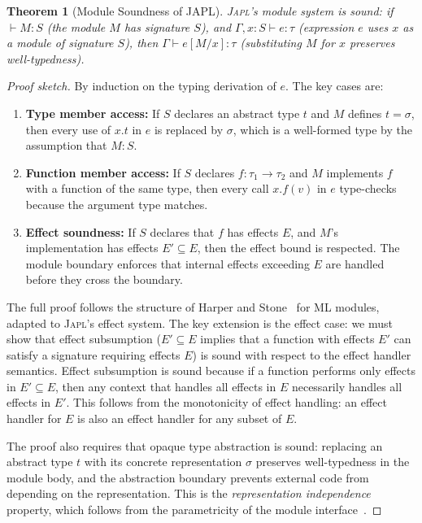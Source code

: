 \documentclass[11pt,a4paper]{article}
\newtheorem{theorem}{Theorem}[section]
\newcommand{\japl}{\textsc{Japl}}
\begin{document}
\begin{theorem}[Module Soundness of JAPL]
\label{thm:module-soundness}
\japl{}'s module system is sound: if $\vdash M : S$ (the module $M$ has signature $S$), and $\Gamma, x : S \vdash e : \tau$ (expression $e$ uses $x$ as a module of signature $S$), then $\Gamma \vdash e[M/x] : \tau$ (substituting $M$ for $x$ preserves well-typedness).
\end{theorem}

\begin{proof}[Proof sketch]
By induction on the typing derivation of $e$. The key cases are:
\begin{enumerate}
  \item \textbf{Type member access:} If $S$ declares an abstract type $t$ and $M$ defines $t = \sigma$, then every use of $x.t$ in $e$ is replaced by $\sigma$, which is a well-formed type by the assumption that $M : S$.
  \item \textbf{Function member access:} If $S$ declares $f : \tau_1 \to \tau_2$ and $M$ implements $f$ with a function of the same type, then every call $x.f(v)$ in $e$ type-checks because the argument type matches.
  \item \textbf{Effect soundness:} If $S$ declares that $f$ has effects $E$, and $M$'s implementation has effects $E' \subseteq E$, then the effect bound is respected. The module boundary enforces that internal effects exceeding $E$ are handled before they cross the boundary.
\end{enumerate}
The full proof follows the structure of Harper and Stone~\citep{harper2000interpretation} for ML modules, adapted to \japl{}'s effect system. The key extension is the effect case: we must show that effect subsumption ($E' \subseteq E$ implies that a function with effects $E'$ can satisfy a signature requiring effects $E$) is sound with respect to the effect handler semantics. Effect subsumption is sound because if a function performs only effects in $E' \subseteq E$, then any context that handles all effects in $E$ necessarily handles all effects in $E'$. This follows from the monotonicity of effect handling: an effect handler for $E$ is also an effect handler for any subset of $E$.

The proof also requires that opaque type abstraction is sound: replacing an abstract type $t$ with its concrete representation $\sigma$ preserves well-typedness in the module body, and the abstraction boundary prevents external code from depending on the representation. This is the \emph{representation independence} property, which follows from the parametricity of the module interface~\citep{reynolds1983types}.
\end{proof}
\end{document}
